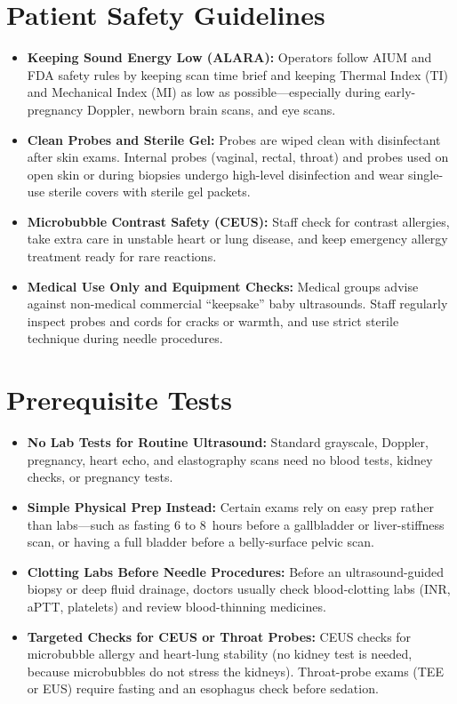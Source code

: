 \section{Patient Safety Guidelines}
\begin{itemize}
  \item \textbf{Keeping Sound Energy Low (ALARA):} Operators follow AIUM and FDA safety rules by keeping scan time brief and keeping Thermal Index (TI) and Mechanical Index (MI) as low as possible---especially during early-pregnancy Doppler, newborn brain scans, and eye scans.
  \item \textbf{Clean Probes and Sterile Gel:} Probes are wiped clean with disinfectant after skin exams. Internal probes (vaginal, rectal, throat) and probes used on open skin or during biopsies undergo high-level disinfection and wear single-use sterile covers with sterile gel packets.
  \item \textbf{Microbubble Contrast Safety (CEUS):} Staff check for contrast allergies, take extra care in unstable heart or lung disease, and keep emergency allergy treatment ready for rare reactions.
  \item \textbf{Medical Use Only and Equipment Checks:} Medical groups advise against non-medical commercial ``keepsake'' baby ultrasounds. Staff regularly inspect probes and cords for cracks or warmth, and use strict sterile technique during needle procedures.
\end{itemize}

\section{Prerequisite Tests}
\begin{itemize}
  \item \textbf{No Lab Tests for Routine Ultrasound:} Standard grayscale, Doppler, pregnancy, heart echo, and elastography scans need no blood tests, kidney checks, or pregnancy tests.
  \item \textbf{Simple Physical Prep Instead:} Certain exams rely on easy prep rather than labs---such as fasting 6 to 8~hours before a gallbladder or liver-stiffness scan, or having a full bladder before a belly-surface pelvic scan.
  \item \textbf{Clotting Labs Before Needle Procedures:} Before an ultrasound-guided biopsy or deep fluid drainage, doctors usually check blood-clotting labs (INR, aPTT, platelets) and review blood-thinning medicines.
  \item \textbf{Targeted Checks for CEUS or Throat Probes:} CEUS checks for microbubble allergy and heart-lung stability (no kidney test is needed, because microbubbles do not stress the kidneys). Throat-probe exams (TEE or EUS) require fasting and an esophagus check before sedation.
\end{itemize}

